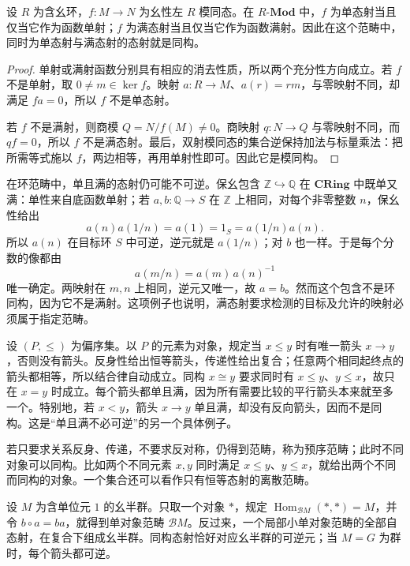 \begin{proposition}\label{b4:prop:module-monos-epis}
	设 \(R\) 为含幺环，\(f:M\rightarrow N\) 为幺性左 \(R\) 模同态。在 \(R\text{-}\mathbf{Mod}\) 中，\(f\) 为单态射当且仅当它作为函数单射；\(f\) 为满态射当且仅当它作为函数满射。因此在这个范畴中，同时为单态射与满态射的态射就是同构。
\end{proposition}
\begin{proof}
	单射或满射函数分别具有相应的消去性质，所以两个充分性方向成立。若 \(f\) 不是单射，取 \(0\ne m\in\ker f\)。映射 \(a:R\rightarrow M\)、\(a(r)=rm\)，与零映射不同，却满足 \(fa=0\)，所以 \(f\) 不是单态射。

	若 \(f\) 不是满射，则商模 \(Q=N/f(M)\ne0\)。商映射 \(q:N\rightarrow Q\) 与零映射不同，而 \(qf=0\)，所以 \(f\) 不是满态射。最后，双射模同态的集合逆保持加法与标量乘法：把所需等式施以 \(f\)，两边相等，再用单射性即可。因此它是模同构。
\end{proof}

在环范畴中，单且满的态射仍可能不可逆。保幺包含 \(\mathbb Z\hookrightarrow\mathbb Q\) 在 \(\mathbf{CRing}\) 中既单又满：单性来自底函数单射；若 \(a,b:\mathbb Q\rightarrow S\) 在 \(\mathbb Z\) 上相同，对每个非零整数 \(n\)，保幺性给出
\[
	a(n)a(1/n)=a(1)=1_S=a(1/n)a(n).
\]
所以 \(a(n)\) 在目标环 \(S\) 中可逆，逆元就是 \(a(1/n)\)；对 \(b\) 也一样。于是每个分数的像都由
\[
	a(m/n)=a(m)\,a(n)^{-1}
\]
唯一确定。两映射在 \(m,n\) 上相同，逆元又唯一，故 \(a=b\)。然而这个包含不是环同构，因为它不是满射。这项例子也说明，满态射要求检测的目标及允许的映射必须属于指定范畴。

\begin{example}\label{b4:ex:poset-category}
	设 \((P,\le)\) 为偏序集。以 \(P\) 的元素为对象，规定当 \(x\le y\) 时有唯一箭头 \(x\rightarrow y\)，否则没有箭头。反身性给出恒等箭头，传递性给出复合；任意两个相同起终点的箭头都相等，所以结合律自动成立。同构 \(x\cong y\) 要求同时有 \(x\le y\)、\(y\le x\)，故只在 \(x=y\) 时成立。每个箭头都单且满，因为所有需要比较的平行箭头本来就至多一个。特别地，若 \(x<y\)，箭头 \(x\rightarrow y\) 单且满，却没有反向箭头，因而不是同构。这是“单且满不必可逆”的另一个具体例子。
\end{example}

若只要求关系反身、传递，不要求反对称，仍得到范畴，称为预序范畴；此时不同对象可以同构。比如两个不同元素 \(x,y\) 同时满足 \(x\leq y\)、\(y\leq x\)，就给出两个不同而同构的对象。一个集合还可以看作只有恒等态射的离散范畴。

\begin{example}\label{b4:ex:one-object-category}
	设 \(M\) 为含单位元 \(1\) 的幺半群。只取一个对象 \(*\)，规定 \(\operatorname{Hom}_{\mathcal BM}(*,*)=M\)，并令 \(b\circ a=ba\)，就得到单对象范畴 \(\mathcal BM\)。反过来，一个局部小单对象范畴的全部自态射，在复合下组成幺半群。同构态射恰好对应幺半群的可逆元；当 \(M=G\) 为群时，每个箭头都可逆。
\end{example}

